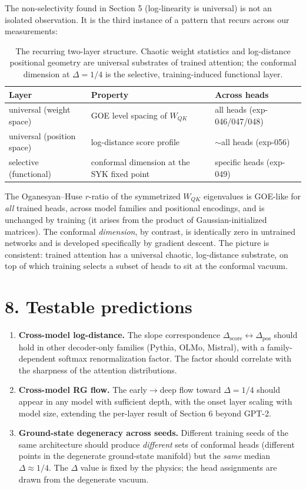 The non-selectivity found in Section 5 (log-linearity is universal) is
not an isolated observation. It is the third instance of a pattern that
recurs across our measurements:

\begin{table}[H]
\centering
\begin{tabular}{lll}
\toprule
Layer & Property & Across heads \\
\midrule
universal (weight space) & GOE level spacing of $W_{QK}$ & all heads (exp-046/047/048) \\
universal (position space) & log-distance score profile & $\sim$all heads (exp-056) \\
selective (functional) & conformal dimension at the SYK fixed point & specific heads (exp-049) \\
\bottomrule
\end{tabular}
\caption{The recurring two-layer structure. Chaotic weight statistics and
log-distance positional geometry are universal substrates of trained
attention; the conformal dimension at $\Delta = 1/4$ is the selective,
training-induced functional layer.}
\end{table}

The Oganesyan--Huse \(r\)-ratio of the symmetrized \(W_{QK}\)
eigenvalues is GOE-like for \emph{all} trained heads, across model
families and positional encodings, and is unchanged by training (it
arises from the product of Gaussian-initialized matrices). The conformal
\emph{dimension}, by contrast, is identically zero in untrained networks
and is developed specifically by gradient descent. The picture is
consistent: trained attention has a universal chaotic, log-distance
substrate, on top of which training selects a subset of heads to sit at
the conformal vacuum.

\section{8. Testable predictions}\label{testable-predictions}

\begin{enumerate}
\def\labelenumi{\arabic{enumi}.}
\item
  \textbf{Cross-model log-distance.} The slope correspondence
  \(\Delta_{\text{score}} \leftrightarrow \Delta_{\text{pos}}\) should
  hold in other decoder-only families (Pythia, OLMo, Mistral), with a
  family-dependent softmax renormalization factor. The factor should
  correlate with the sharpness of the attention distributions.
\item
  \textbf{Cross-model RG flow.} The early\(\to\)deep flow toward
  \(\Delta = 1/4\) should appear in any model with sufficient depth,
  with the onset layer scaling with model size, extending the per-layer
  result of Section 6 beyond GPT-2.
\item
  \textbf{Ground-state degeneracy across seeds.} Different training
  seeds of the same architecture should produce \emph{different} sets of
  conformal heads (different points in the degenerate ground-state
  manifold) but the \emph{same} median \(\Delta \approx 1/4\). The
  \(\Delta\) value is fixed by the physics; the head assignments are
  drawn from the degenerate vacuum.
\end{enumerate}

